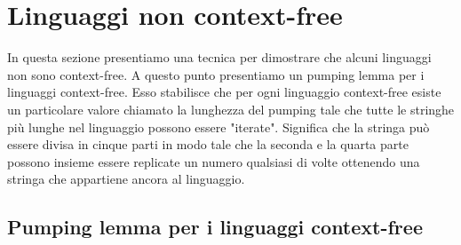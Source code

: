 \section{Linguaggi non context-free}
In questa sezione presentiamo una tecnica per dimostrare che alcuni linguaggi non sono context-free. A questo punto presentiamo un pumping lemma per i linguaggi context-free. Esso stabilisce che per ogni linguaggio context-free esiste un particolare valore chiamato la lunghezza del pumping tale che tutte le stringhe più lunghe nel linguaggio possono essere "iterate". Significa che la stringa può essere divisa in cinque parti in modo tale che la seconda e la quarta parte possono insieme essere replicate un numero qualsiasi di volte ottenendo una stringa che appartiene ancora al linguaggio.

\subsection{Pumping lemma per i linguaggi context-free}
